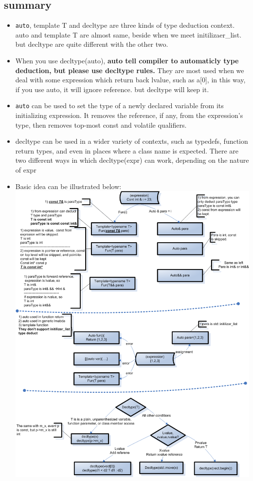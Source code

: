 \documentclass[a4paper,11pt,twoside]{book}
\begin{document}
\subsection{summary}
\begin{itemize}
	\item \texttt{auto}, template T and decltype are three kinds of type deduction context. auto and template T are almost same, beside when we meet initilizaer\_list. but decltype are quite different with the other two. 
	
	\item When you use decltype(auto), \textbf{auto tell compiler to automaticly type deduction, but please use decltype rules.} They are most used when we deal with some expression which return back lvalue, such as a[0], in this way, if you use auto, it will ignore reference. but decltype will keep it. 
	
	\item \texttt{auto} can be used to set the type of a newly declared variable from its initializing expression. It removes the reference, if any, from the expression's type, then removes top-most const and volatile qualifiers.
	
	\item decltype can be used in a wider variety of contexts, such as typedefs, function return types, and even in places where a class name is expected. There are two different ways in which decltype(expr) can work, depending on the nature of expr
	
	
	\item Basic idea can be illustrated below: \newline
	\includegraphics[scale=0.7]{pics/type_deduct.png}
\end{itemize}
\end{document}
